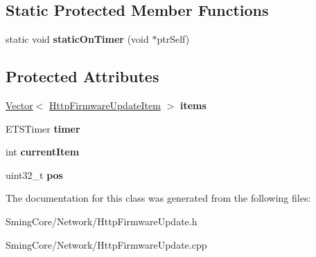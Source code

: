 \subsection*{Static Protected Member Functions}
\begin{DoxyCompactItemize}
\item 
\hypertarget{class_http_firmware_update_a2a17245cbc6850ef011967120b62dc26}{}static void {\bfseries static\+On\+Timer} (void $\ast$ptr\+Self)\label{class_http_firmware_update_a2a17245cbc6850ef011967120b62dc26}

\end{DoxyCompactItemize}
\subsection*{Protected Attributes}
\begin{DoxyCompactItemize}
\item 
\hypertarget{class_http_firmware_update_ae38c2e3ff45204385b84b7bb94790099}{}\hyperlink{class_vector}{Vector}$<$ \hyperlink{struct_http_firmware_update_item}{Http\+Firmware\+Update\+Item} $>$ {\bfseries items}\label{class_http_firmware_update_ae38c2e3ff45204385b84b7bb94790099}

\item 
\hypertarget{class_http_firmware_update_a9c1cf4d965bcab54c7519c8bb06b632b}{}E\+T\+S\+Timer {\bfseries timer}\label{class_http_firmware_update_a9c1cf4d965bcab54c7519c8bb06b632b}

\item 
\hypertarget{class_http_firmware_update_a5272fba1a38647606d8b93da3aec1e61}{}int {\bfseries current\+Item}\label{class_http_firmware_update_a5272fba1a38647606d8b93da3aec1e61}

\item 
\hypertarget{class_http_firmware_update_a5dd41a15dfc83b707e087c5c528cf99e}{}uint32\+\_\+t {\bfseries pos}\label{class_http_firmware_update_a5dd41a15dfc83b707e087c5c528cf99e}

\end{DoxyCompactItemize}


The documentation for this class was generated from the following files\+:\begin{DoxyCompactItemize}
\item 
Sming\+Core/\+Network/Http\+Firmware\+Update.\+h\item 
Sming\+Core/\+Network/Http\+Firmware\+Update.\+cpp\end{DoxyCompactItemize}
